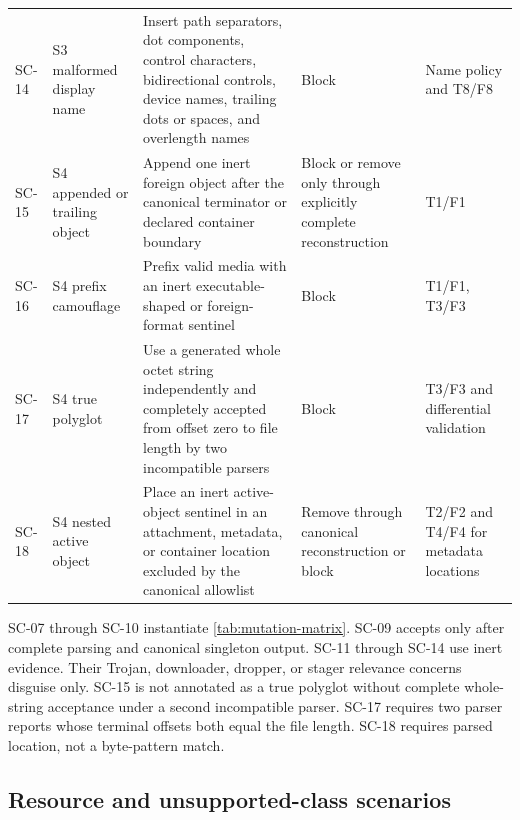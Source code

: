 \begin{longtable}{L{0.08\textwidth}L{0.16\textwidth}L{0.34\textwidth}L{0.11\textwidth}L{0.13\textwidth}}
SC-14 & S3 malformed display name & Insert path separators, dot components, control characters, bidirectional controls, device names, trailing dots or spaces, and overlength names & Block & Name policy and T8/F8 \\
SC-15 & S4 appended or trailing object & Append one inert foreign object after the canonical terminator or declared container boundary & Block or remove only through explicitly complete reconstruction & T1/F1 \\
SC-16 & S4 prefix camouflage & Prefix valid media with an inert executable-shaped or foreign-format sentinel & Block & T1/F1, T3/F3 \\
SC-17 & S4 true polyglot & Use a generated whole octet string independently and completely accepted from offset zero to file length by two incompatible parsers & Block & T3/F3 and differential validation \\
SC-18 & S4 nested active object & Place an inert active-object sentinel in an attachment, metadata, or container location excluded by the canonical allowlist & Remove through canonical reconstruction or block & T2/F2 and T4/F4 for metadata locations \\
\bottomrule
\end{longtable}
\endgroup

SC-07 through SC-10 instantiate \cref{tab:mutation-matrix}. SC-09 accepts only
after complete parsing and canonical singleton output. SC-11 through SC-14 use
inert evidence. Their Trojan, downloader, dropper, or stager relevance concerns
disguise only. SC-15 is not annotated as a true polyglot without complete
whole-string acceptance under a second incompatible parser. SC-17 requires two
parser reports whose terminal offsets both equal the file length. SC-18
requires parsed location, not a byte-pattern match.

\subsection{Resource and unsupported-class scenarios}
\label{subsec:scenario-resource}

